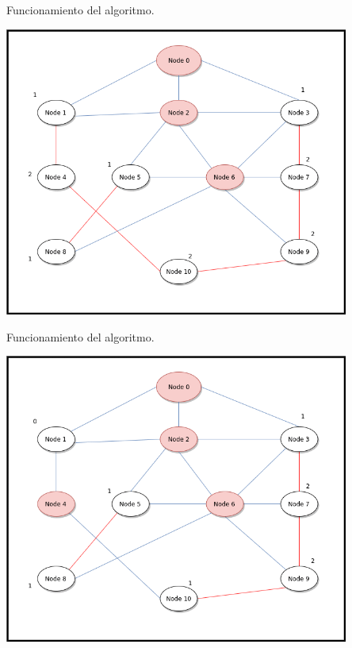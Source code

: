 \documentclass[10pt]{beamer}
\begin{document}
\begin{frame}{Funcionamiento del algoritmo.}{}
	\begin{block}{}
		\includegraphics[width=0.85\textwidth]{gif-4.png}
	\end{block}
\end{frame}
\begin{frame}{Funcionamiento del algoritmo.}{}
	\begin{block}{}
		\includegraphics[width=0.85\textwidth]{gif-5.png}
	\end{block}
\end{frame}
\end{document}
